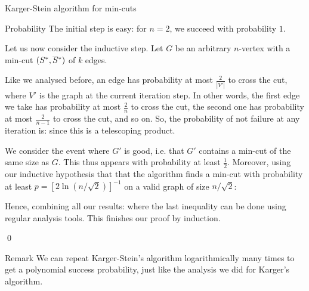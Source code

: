 \documentclass[a4paper]{article}
\begin{document}
\begin{parag}{Karger-Stein algorithm for min-cuts}
\begin{subparag}{Probability}
        The initial step is easy: for $n = 2$, we succeed with probability $1$.

        Let us now consider the inductive step. Let $G$ be an arbitrary $n$-vertex with a min-cut $\left(S^*, \smash{\bar{S}}^*\right)$ of $k$ edges.

        Like we analysed before, an edge has probability at most $\frac{2}{\left|V'\right|}$ to cross the cut, where $V'$ is the graph at the current iteration step. In other words, the first edge we take has probability at most $\frac{2}{n}$ to cross the cut, the second one has probability at most $\frac{2}{n - 1}$ to cross the cut, and so on. So, the probability of not failure at any iteration is: 
        since this is a telescoping product.

        We consider the event where $G'$ is good, i.e. that $G'$ contains a min-cut of the same size as $G$. This thus appears with probability at least $\frac{1}{2}$. Moreover, using our inductive hypothesis that that the algorithm finds a min-cut with probability at least $p = \left[2 \ln\left(n / \sqrt{2}\right)\right]^{-1}$ on a valid graph of size $n / \sqrt{2}$: 
        
        Hence, combining all our results: 
        where the last inequality can be done using regular analysis tools. This finishes our proof by induction.

        \qed
    \end{subparag}

    \begin{subparag}{Remark}
        We can repeat Karger-Stein's algorithm logarithmically many times to get a polynomial success probability, just like the analysis we did for Karger's algorithm.
    \end{subparag}
\end{parag}
\end{document}
